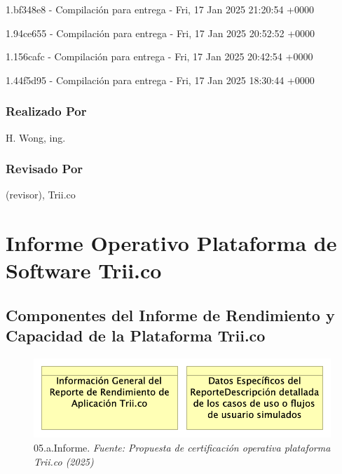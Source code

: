 \documentclass[
  paper=a4,
  ,captions=tableheading
]{scrartcl}
\renewenvironment{quote}{\begin{customblockquote}\list{}{\rightmargin=0em\leftmargin=0em}%
\item\relax\color{blockquote-text}\ignorespaces}{\unskip\unskip\endlist\end{customblockquote}}
\begin{document}
1.bf348e8 - Compilación para entrega - Fri, 17 Jan 2025 21:20:54 +0000

1.94ce655 - Compilación para entrega - Fri, 17 Jan 2025 20:52:52 +0000

1.156cafc - Compilación para entrega - Fri, 17 Jan 2025 20:42:54 +0000

1.44f5d95 - Compilación para entrega - Fri, 17 Jan 2025 18:30:44 +0000

\subsubsection{Realizado Por}\label{sec:realizado-por}

H. Wong, ing.

\subsubsection{Revisado Por}\label{sec:revisado-por}

(revisor), Trii.co

\newpage

\section{Informe Operativo Plataforma de Software
Trii.co}\label{sec:informe-operativo-plataforma-de-software-trii.co}

\subsection{Componentes del Informe de Rendimiento y Capacidad de la
Plataforma
Trii.co}\label{sec:componentes-del-informe-de-rendimiento-y-capacidad-de-la-plataforma-trii.co}

\begin{quote}
\end{quote}

\begin{figure}
\centering
\includegraphics{images/05.a.Informe.png}
\caption{05.a.Informe. \emph{Fuente: Propuesta de certificación
operativa plataforma Trii.co
(2025)}}\label{fig:id-04abc8f16f354757a52791da825e4049}
\end{figure}
\end{document}
